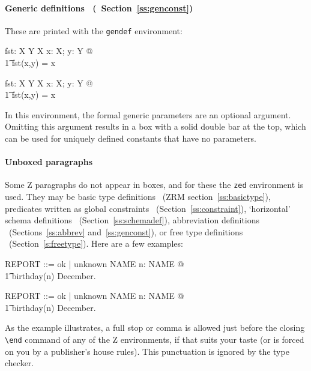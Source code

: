 \paragraph{Generic definitions%
        \ifmanual\ \rm (\ZRM\ Section~\protect\ref{ss:genconst})\fi}%
These are printed with the \verb/gendef/ environment:%
\begin{demo}
\begin{gendef}[X,Y]
    fst: X \cross Y \fun X
\where
    \forall x: X; y: Y @ \\
\t1     fst(x,y) = x
\end{gendef}
\gives
\begin{gendef}[X,Y]
    fst: X \cross Y \fun X
\where
    \forall x: X; y: Y @ \\
\t1     fst(x,y) = x
\end{gendef}
\end{demo} 
In this environment, the formal generic parameters%
 are an optional argument.  Omitting this
argument results in a box with a solid double bar at the top, which
can be used for uniquely defined constants that have no parameters.

\paragraph{Unboxed paragraphs}
Some Z paragraphs do not appear in boxes, and for these the
\verb/zed/ environment is used.  They may
be basic type definitions%
\ifmanual\ (ZRM section~\ref{ss:basictype})\fi,
predicates written as global constraints%
\ifmanual\ (Section~\ref{ss:constraint})\fi,
`horizontal' schema definitions%
\ifmanual\ (Section~\ref{ss:schemadef})\fi,
abbreviation definitions%
\ifmanual\ (Sections~\ref{ss:abbrev} and~\ref{ss:genconst})\fi,
or free type definitions%
\ifmanual\ (Section~\ref{s:freetype})\fi.
Here are a few examples:
\begin{demo}
\begin{zed}
\also
    REPORT ::= ok | unknown \ldata NAME \rdata
\also
    \exists n: NAME @ \\
\t1     birthday(n) \in December.
\end{zed}
\gives
\begin{zed}
\also
    REPORT ::= ok | unknown \ldata NAME \rdata
\also
    \exists n: NAME @ \\
\t1     birthday(n) \in December.
\end{zed}
\end{demo}
As the example illustrates, a full stop%
 or comma is allowed just
before the closing \verb/\end/ command of any of the Z environments,
if that suits your taste (or is forced on you by a publisher's house
rules).  This punctuation is ignored by the type checker.

